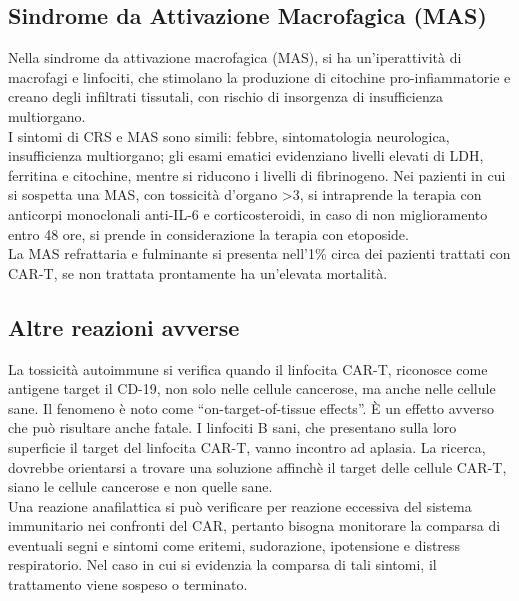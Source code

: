 \subsection{Sindrome da Attivazione Macrofagica (MAS)}

Nella sindrome da attivazione macrofagica (MAS), si ha un’iperattività di macrofagi e linfociti, che stimolano la 
produzione di citochine pro-infiammatorie e creano degli infiltrati tissutali, con rischio di insorgenza di 
insufficienza multiorgano\cite{EMATOCART}.\\
I sintomi di CRS e MAS sono simili: febbre, sintomatologia neurologica, insufficienza multiorgano; 
gli esami ematici evidenziano livelli elevati di LDH, ferritina e citochine, mentre si
riducono i livelli di fibrinogeno\cite{EMATOCART}.
Nei pazienti in cui si sospetta una MAS, con tossicità d’organo >3, si intraprende la terapia con anticorpi monoclonali 
anti-IL-6 e corticosteroidi, in caso di non miglioramento entro 48 ore, 
si prende in considerazione la terapia con etoposide.\\
La MAS refrattaria e fulminante si presenta nell’1\% circa dei pazienti trattati con CAR-T, 
se non trattata prontamente ha un’elevata mortalità\cite{EMATOCART}.

\subsection{Altre reazioni avverse}

La tossicità autoimmune si verifica quando il linfocita CAR-T, riconosce come antigene target il CD-19, non solo nelle 
cellule cancerose, ma anche nelle cellule sane\cite{Frontiers}.
Il fenomeno è noto come “on-target-of-tissue effects”. È un effetto avverso che può risultare anche fatale.
I linfociti B sani, che presentano sulla loro superficie il target del linfocita CAR-T, vanno 
incontro ad aplasia. La ricerca, dovrebbe orientarsi a trovare una soluzione affinchè il target delle cellule CAR-T, 
siano le cellule cancerose e non quelle sane\cite{Frontiers}.\\

Una reazione anafilattica si può verificare per reazione eccessiva del sistema immunitario nei confronti del CAR, 
pertanto bisogna monitorare la comparsa di eventuali segni e sintomi come eritemi, 
sudorazione, ipotensione e distress respiratorio\cite{EMATOCART}.
Nel caso in cui si evidenzia la comparsa di tali sintomi, il trattamento viene sospeso o terminato\cite{Frontiers}.\\

